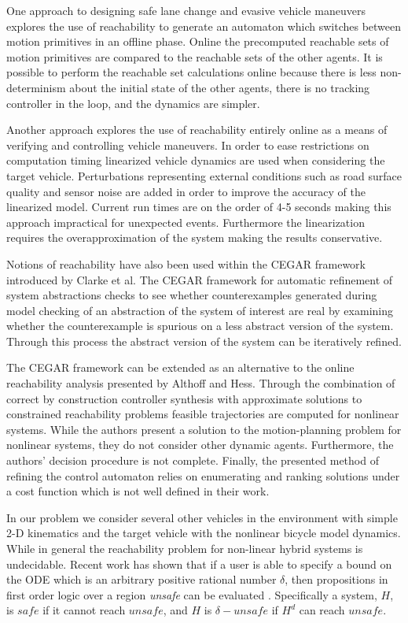 One approach to designing safe lane change and evasive vehicle maneuvers explores the use of reachability to generate an automaton which switches between motion primitives in an offline phase. Online the precomputed reachable sets of motion primitives are compared to the reachable sets of the other agents. It is possible to perform the reachable set calculations online because there is less non-determinism about the initial state of the other agents, there is no tracking controller in the loop, and the dynamics are simpler.\cite{Hess2014}

Another approach explores the use of reachability entirely online as a means of verifying and controlling vehicle maneuvers. In order to ease restrictions on computation timing linearized vehicle dynamics are used when considering the target vehicle. Perturbations representing external conditions such as road surface quality and sensor noise are added in order to improve the accuracy of the linearized model. Current run times are on the order of 4-5 seconds making this approach impractical for unexpected events. Furthermore the linearization requires the overapproximation of the system making the results conservative.\cite{Althoff2014b}

Notions of reachability have also been used within the CEGAR framework introduced by Clarke et al. The CEGAR framework for automatic refinement of system abstractions checks to see whether counterexamples generated during model checking of an abstraction of the system of interest are real by examining  whether the counterexample is spurious on a less abstract version of the system. Through this process the abstract version of the system can be iteratively refined.\cite{Clarke2003}

The CEGAR framework can be extended as an alternative to the online reachability analysis presented by Althoff and Hess. Through the combination of correct by construction controller synthesis with approximate solutions to constrained reachability problems feasible trajectories are computed for nonlinear systems. While the authors present a solution to the motion-planning problem for nonlinear systems, they do not consider other dynamic agents. Furthermore, the authors' decision procedure is not complete. Finally, the presented method of refining the control automaton relies on enumerating and ranking solutions under a cost function which is not well defined in their work.\cite{Wolff2013}

In our problem we consider several other vehicles in the environment with simple 2-D kinematics and the target vehicle with the nonlinear bicycle model dynamics. While in general the reachability problem for non-linear hybrid systems is undecidable. Recent work has shown that if a user is able to specify a bound on the ODE which is an arbitrary positive rational number \(\delta\), then propositions in first order logic over a region \textit{unsafe} can be evaluated \cite{gao2014delta}. Specifically a system, \(H\), is \(safe\) if it cannot reach \(unsafe\), and \(H\) is \(\delta-unsafe\) if \(H^d\) can reach \(unsafe\). 


